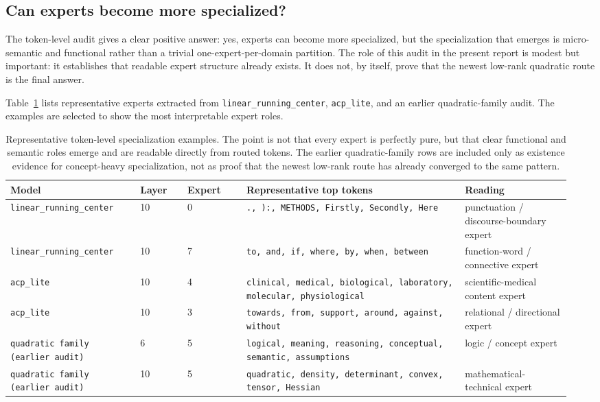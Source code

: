 \documentclass[11pt]{article}
\newcommand{\tablesize}{\footnotesize}
\begin{document}
\subsection{Can experts become more specialized?}

The token-level audit gives a clear positive answer: yes, experts can become more specialized, but the specialization that emerges is micro-semantic and functional rather than a trivial one-expert-per-domain partition. The role of this audit in the present report is modest but important: it establishes that readable expert structure already exists. It does not, by itself, prove that the newest low-rank quadratic route is the final answer.

Table~\ref{tab:token-audit} lists representative experts extracted from \texttt{linear\_running\_center}, \texttt{acp\_lite}, and an earlier quadratic-family audit. The examples are selected to show the most interpretable expert roles.

\begin{table}[H]
\centering
\tablesize
\begin{adjustbox}{max width=\linewidth}
\begin{tabular}{p{0.22\linewidth}p{0.08\linewidth}p{0.10\linewidth}p{0.37\linewidth}p{0.18\linewidth}}
\toprule
Model & Layer & Expert & Representative top tokens & Reading \\
\midrule
\texttt{linear\_running\_center} & 10 & 0 & \texttt{., ):, METHODS, Firstly, Secondly, Here} & punctuation / discourse-boundary expert \\
\texttt{linear\_running\_center} & 10 & 7 & \texttt{to, and, if, where, by, when, between} & function-word / connective expert \\
\texttt{acp\_lite} & 10 & 4 & \texttt{clinical, medical, biological, laboratory, molecular, physiological} & scientific-medical content expert \\
\texttt{acp\_lite} & 10 & 3 & \texttt{towards, from, support, around, against, without} & relational / directional expert \\
\texttt{quadratic family (earlier audit)} & 6 & 5 & \texttt{logical, meaning, reasoning, conceptual, semantic, assumptions} & logic / concept expert \\
\texttt{quadratic family (earlier audit)} & 10 & 5 & \texttt{quadratic, density, determinant, convex, tensor, Hessian} & mathematical-technical expert \\
\bottomrule
\end{tabular}
\end{adjustbox}
\caption{Representative token-level specialization examples. The point is not that every expert is perfectly pure, but that clear functional and semantic roles emerge and are readable directly from routed tokens. The earlier quadratic-family rows are included only as existence evidence for concept-heavy specialization, not as proof that the newest low-rank route has already converged to the same pattern.}
\label{tab:token-audit}
\end{table}
\end{document}
